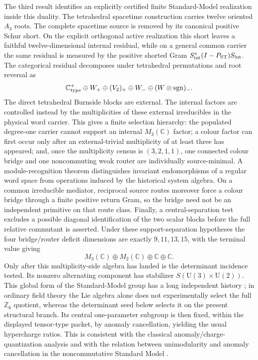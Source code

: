 \documentclass[11pt]{article}
\theoremstyle{definition}
\theoremstyle{remark}
\newcommand{\Z}{\mathbb Z}
\newcommand{\C}{\mathbb C}
\newcommand{\U}{\mathrm U}
\begin{document}
The third result identifies an explicitly certified finite Standard-Model realization
inside this duality.  The tetrahedral spacetime construction carries twelve
oriented $A_3$ roots.  The complete spacetime source is removed by its canonical
positive Schur short.  On the explicit orthogonal active realization this short
leaves a faithful twelve-dimensional internal residual, while on a general
common carrier the same residual is measured by the positive shorted Gram
$S_{\rm int}^*(I-P_{\rm ST})S_{\rm int}$.  The categorical residual decomposes
under tetrahedral permutations and root reversal as
\begin{equation}
\C_{\rm type}^{+}
\oplus W_+
\oplus (V_2)_+
\oplus W_-
\oplus (W\otimes{\rm sgn})_- .
\label{eq:intro-residual-decomposition}
\end{equation}
The direct tetrahedral Burnside blocks are external.  The internal factors are
controlled instead by the multiplicities of these external irreducibles in the
physical word carrier.  This gives a finite selection hierarchy: the populated
degree-one carrier cannot support an internal $M_3(\C)$ factor; a colour factor
can first occur only after an external-trivial multiplicity of at least three
has appeared; and, once the multiplicity census is $(3,2,1,1)$, one connected
colour bridge and one noncommuting weak router are individually source-minimal.
A module-recognition theorem distinguishes invariant endomorphisms of a regular
word space from operations induced by the historical system algebra.  On a
common irreducible mediator, reciprocal source routes moreover force a colour
bridge through a finite positive return Gram, so the bridge need not be an
independent primitive on that route class.  Finally, a central-separation test
excludes a possible diagonal identification of the two scalar blocks before the
full relative commutant is asserted.  Under these support-separation hypotheses
the four bridge/router deficit dimensions are exactly $9,11,13,15$, with the
terminal value giving
\[
M_3(\C)\oplus M_2(\C)\oplus\C\oplus\C.
\]
Only after this multiplicity-side algebra has landed is the determinant
incidence tested.  Its nonzero alternating component has stabilizer
$S(\U(3)\times\U(2))$.  This global form of the Standard-Model group has a
long independent history \cite{Hucks1991,Tong2017}; in ordinary field theory
the Lie algebra alone does not experimentally select the full $\Z_6$ quotient,
whereas the determinant seed below selects it on the present structural branch.
Its central one-parameter subgroup is then fixed, within the displayed
tensor-type packet, by anomaly cancellation, yielding the usual hypercharge
ratios.  This is consistent with the classical anomaly/charge-quantization
analysis \cite{GengMarshak1989,MinahanRamondWarner1990} and with the relation
between unimodularity and anomaly cancellation in the noncommutative Standard
Model \cite{AlvarezGraciaBondiaMartin1995}.
\end{document}
